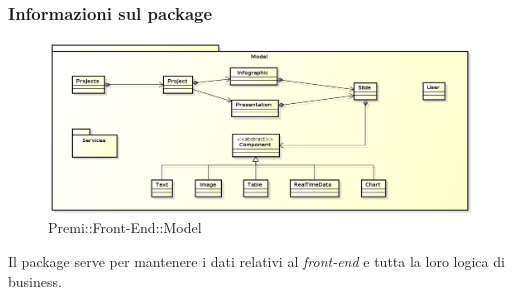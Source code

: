 	\subsubsection*{Informazioni sul package}
		\begin{figure}[h]
			\centering
			\includegraphics[width=1.0\linewidth]{img/front-end-package_model}
			\caption[Premi::Front-End::Model]{Premi::Front-End::Model}
		\end{figure}
		Il package serve per mantenere i dati relativi al \textit{front-end} e tutta la loro logica di business.

